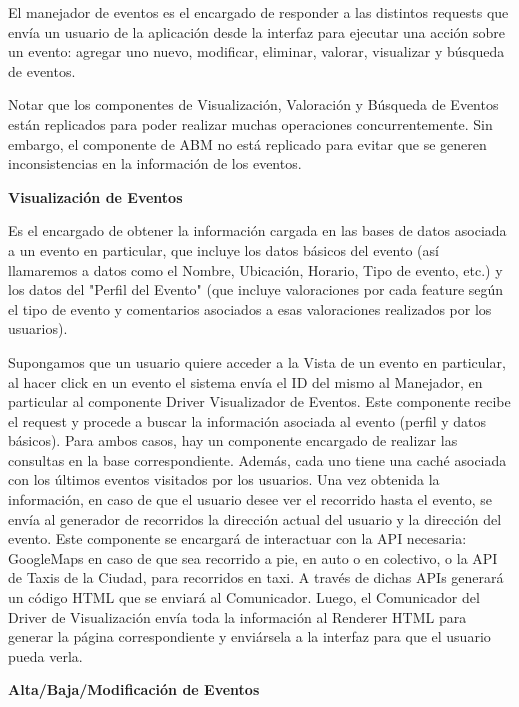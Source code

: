 El manejador de eventos es el encargado de responder a las distintos requests que envía un usuario de la aplicación desde la interfaz para ejecutar una acción sobre un evento: agregar uno nuevo, modificar, eliminar, valorar, visualizar y búsqueda de eventos.

Notar que los componentes de Visualización, Valoración y Búsqueda de Eventos están replicados para poder realizar muchas operaciones concurrentemente. Sin embargo, el componente de ABM no está replicado para evitar que se generen inconsistencias en la información de los eventos.

\textbf{Visualización de Eventos}

Es el encargado de obtener la información cargada en las bases de datos asociada a un evento en particular, que incluye los datos básicos del evento (así llamaremos a datos como el Nombre, Ubicación, Horario, Tipo de evento, etc.) y los datos del "Perfil del Evento" (que incluye valoraciones por cada feature según el tipo de evento y comentarios asociados a esas valoraciones realizados por los usuarios).

Supongamos que un usuario quiere acceder a la Vista de un evento en particular, al hacer click en un evento el sistema envía el ID del mismo al Manejador, en particular al componente Driver Visualizador de Eventos. Este componente recibe el request y procede a buscar la información asociada al evento (perfil y datos básicos). Para ambos casos, hay un componente encargado de realizar las consultas en la base correspondiente. Además, cada uno tiene una caché asociada con los últimos eventos visitados por los usuarios. Una vez obtenida la información, en caso de que el usuario desee ver el recorrido hasta el evento, se envía al generador de recorridos la dirección actual del usuario y la dirección del evento. Este componente se encargará de interactuar con la API necesaria: GoogleMaps en caso de que sea recorrido a pie, en auto o en colectivo, o la API de Taxis de la Ciudad, para recorridos en taxi. A través de dichas APIs generará un código HTML que se enviará al Comunicador. Luego, el Comunicador del Driver de Visualización envía toda la información al Renderer HTML para generar la página correspondiente y enviársela a la interfaz para que el usuario pueda verla.

\textbf{Alta/Baja/Modificación de Eventos}

